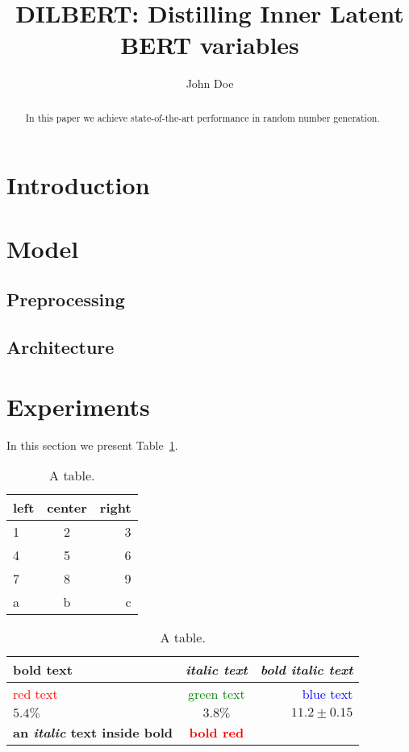 \documentclass{article}
\title{DILBERT: Distilling Inner Latent BERT variables}
\author{John Doe}
\begin{document}
\maketitle
\begin{abstract}
  In this paper we achieve state-of-the-art performance in random number generation.
\end{abstract}
\section{Introduction}
\section{Model}
\subsection{Preprocessing}
\subsection{Architecture}
\section{Experiments}
In this section we present Table~\ref{tab}.
  \begin{table}
    \begin{tabular}{lcr} \toprule
      left & center & right\\\midrule
      1 & 2 & 3\\
      4 & 5 & 6\\\midrule
      7 & 8 & 9\\
      a & b & c\\\bottomrule
    \end{tabular}
    \caption{A table.}
    \label{tab}
  \end{table}
  \begin{table}
    \begin{tabular}{lcr} \toprule
      \textbf{bold text} & \textit{italic text} & \textbf{\textit{bold italic text}}\\\midrule
      \textcolor{red}{red text} & \textcolor{green}{green text} & \textcolor{blue}{blue text}\\
      $\mathbf{5.4\%}$ & $\mathit{3.8\%}$ & $\mathbf{11.2}\pm 0.15$\\\midrule
      \textbf{an \textit{italic} text inside bold}  & {\bf \textcolor{red}{bold red}} & \\\bottomrule
    \end{tabular}
    \caption{A table.}
    \label{tab2}
  \end{table}
\end{document}
